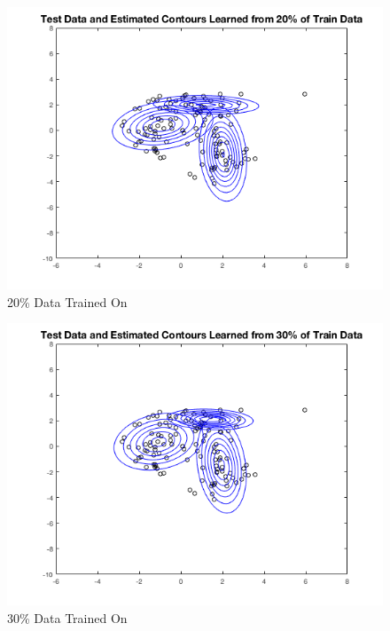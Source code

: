 \documentclass[english]{article}
\begin{document}
\begin{enumerate}
\begin{enumerate}
	\begin{figure}[H]
        \centering
    	\includegraphics[scale = 0.5]{3_1_b_20}
    	\caption{20\% Data Trained On}
    	\label{fig:3_1_b_20}
    	\end{figure}
	
	\begin{figure}[H]
        \centering
    	\includegraphics[scale = 0.5]{3_1_b_30}
    	\caption{30\% Data Trained On}
    	\label{fig:3_1_b_30}
    	\end{figure}
	

\end{enumerate}
\end{enumerate}
\end{document}
